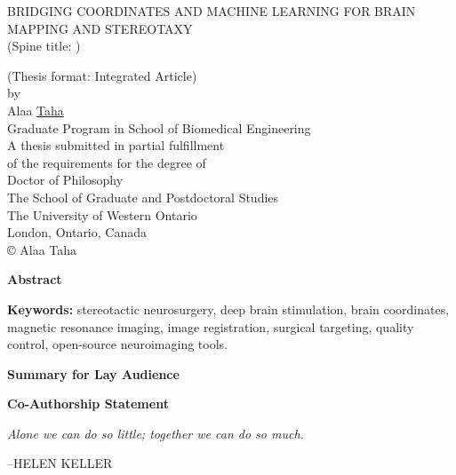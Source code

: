 \documentclass[hidelinks,12pt,oneside]{report}
\makeatletter
\newlength\longest
\numberwithin{figure}{chapter}
\newenvironment{preliminary}%
{\pagestyle{plain}\pagenumbering{roman}}%
{\pagenumbering{arabic}}
\newcommand\isco[1]{%
  \edef\@tempa{#1}%
  \def\@tempb{}%
  \ifx\@tempa\@tempb
	\else \\\underline{Co-Supervisor:}\vspace{0.35in}\\\dots\dots\dots\dots\dots\dots\dots\\{#1}\\
  \fi
}
\newcommand\isjoint[1]{%
  \edef\@tempa{#1}%
  \def\@tempb{}%
  \ifx\@tempa\@tempb
	\else \\\underline{Joint Supervisor:}\vspace{0.35in}\\\dots\dots\dots\dots\dots\dots\dots\\{#1}\\
  \fi
}
\newcommand\isalt[1]{%
  \edef\@tempa{#1}%
  \def\@tempb{}%
  \ifx\@tempa\@tempb
	\else \\\underline{Alternate Supervisor:}\vspace{0.35in}\\\dots\dots\dots\dots\dots\dots\dots\\{#1}\\
  \fi
}
\newcommand\isdefinedsig[1]{%
  \edef\@tempa{#1}%
  \def\@tempb{}%
  \ifx\@tempa\@tempb
	\else \\ \dots\dots\dots\dots\dots\dots\dots\\{#1}\\
  \fi
}
\newcommand\isdefinedspinetitle[1]{%
  \edef\@tempa{#1}%
  \def\@tempb{}%
  \ifx\@tempa\@tempb
	\else (Spine title: #1)\\
  \fi
}
\newcommand\acknowlege[1]{%
  \edef\@tempa{#1}%
  \def\@tempb{}%
  \ifx\@tempa\@tempb
	\else \newpage \Large Acknowledgements\normalsize\\\indent\\#1\newpage
  \fi
}
\newcommand{\super}{Dr. Supervisor1} %
\newcommand{\superj}{Dr. Supervisor2} %
\newcommand{\superc}{} %
\newcommand{\supera}{} %
\newcommand{\scoa}{Dr. Committee1}  %
\newcommand{\scob}{Dr. Committee2}  %
\newcommand{\scoc}{Dr. Committee3}  %
\newcommand{\sct}{}  %
\newcommand{\examo}{Dr. Examiner1}  %
\newcommand{\examt}{Dr. Examiner2}
\newcommand{\examth}{Dr. Examiner3}
\newcommand{\examf}{Dr. Examiner4}
\newcommand{\department}{School of Biomedical Engineering}
\newcommand{\degree}{Doctor of Philosophy}
\newcommand{\firstname}{Alaa}
\newcommand{\middlename}{}
\newcommand{\lastname}{Taha}
\newcommand{\authorname}{{\firstname} {\middlename} {\lastname}}
\newcommand{\titl}{Bridging coordinates and machine learning for brain mapping and stereotaxy}
\newcommand{\spinetitle}{}%
\newcommand{\thesisformat}{Integrated Article} %
\newcommand{\gyear}{\number\year}
\newcommand{\makeacknowlege} {
}
\renewcommand{\maketitle}
{\begin{titlepage}
   \setcounter{page}{1}
   \begin{large}
   \begin{center}
      \mbox{}
      \vfill
      {\MakeUppercase{\titl}}\\
      \isdefinedspinetitle{\spinetitle}
      (Thesis format: \thesisformat)\\
      \vfill
      by \\
      \vfill
      {\firstname{} \middlename } \underline{\lastname}\\
      \vfill
      Graduate Program in {\department}\\
      \vfill
		A thesis submitted in partial fulfillment\\
		of the requirements for the degree of\\
		\degree\\
		\vfill
		The School of Graduate and Postdoctoral Studies\\
		The University of Western Ontario\\
		London, Ontario, Canada\\
		\vfill
      {\copyright} {\authorname} {\gyear}  \\
      \vspace*{.2in}
   \end{center}
   \end{large}
   \end{titlepage}

}%
\newcommand{\makecert}{
   \setcounter{page}{2}
\vfill
\begin{center}
\large
THE UNIVERSITY OF WESTERN ONTARIO\\
School of Graduate and Postdoctoral Studies\\
\vfill
\textbf{CERTIFICATE OF EXAMINATION}
\end{center}

\vfill
\begin{table}[ht]
\begin{minipage}[t]{0.5\linewidth} %
\begin{tabular}{l}
\underline{Supervisor:}\vspace{0.35in}
\isdefinedsig{\super}
\isco{\superc}
\isjoint{\superj}
\isalt{\supera}
\\
\end{tabular}
\vfill
\end{minipage}
\hspace{0.5in}
\begin{minipage}[t]{0.5\linewidth}
\begin{tabular}{l}
\underline{Examiners:} \\\vspace{.5cm}
\isdefinedsig{\examo}\\
\isdefinedsig{\examt}\\
\isdefinedsig{\examth}\\
\isdefinedsig{\examf}
\end{tabular}
\vfill
\end{minipage}
\vfill
\end{table}
\vfill
\begin{center}
The thesis by \\ \vfill
\textbf{\firstname{} \middlename{} \underline{\lastname}}\\
\vfill
entitled:\\\vfill
\textbf{\titl}\\\vfill
is accepted in partial fulfillment of the \\
requirements for the degree of\\
\degree\\
\end{center}
\begin{table}[ht]
\begin{minipage}[t]{0.5\linewidth}
\begin{tabular}{l}
\dots\dots\dots\dots\dots\\
Date
\end{tabular}
\end{minipage}
\hspace{0.5in}
\begin{minipage}[t]{0.5\linewidth}
\begin{tabular}{l}
\dots\dots\dots\dots\dots\dots\dots\dots\dots\dots\\
Chair of the Thesis Examination Board
\end{tabular}
\end{minipage}
\end{table}

}
\makeatother
\begin{document}


\begin{preliminary}

\maketitle
\setcounter{page}{2}
{}
\Large\begin{center}\textbf{Abstract}\end{center}\normalsize


\vfill
\noindent\textbf{Keywords:} stereotactic neurosurgery, deep brain stimulation, brain coordinates, magnetic resonance imaging, image registration, surgical targeting, quality control, open-source neuroimaging tools.
\newpage


\clearpage
{}
{}
\Large\begin{center}\textbf{Summary for Lay Audience}\end{center}\normalsize



\vfill
\newpage

{}
\Large\begin{center}\textbf{Co-Authorship Statement}\end{center}\normalsize

\vfill
\newpage

\clearpage

\thispagestyle{empty}
\null\vfill
{
	\settowidth{}
	\centering
	\hspace{3cm}\parbox{\longest}{%
		\raggedright{\Large\itshape%
      Alone we can do so little; together we can do so much.\par\bigskip
		}   
		\raggedleft\MakeUppercase{--Helen Keller}\par%
}}


\end{preliminary}
\end{document}
